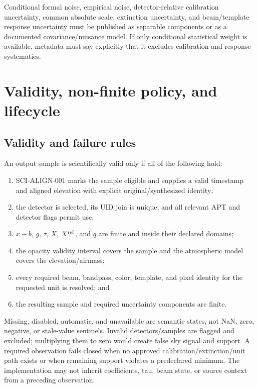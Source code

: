 \documentclass[11pt]{article}
\begin{document}
Conditional formal noise, empirical noise, detector-relative calibration
uncertainty, common absolute scale, extinction uncertainty, and beam/template
response uncertainty must be published as separable components or as a
documented covariance/nuisance model.  If only conditional statistical weight
is available, metadata must say explicitly that it excludes calibration and
response systematics.

\section{Validity, non-finite policy, and lifecycle}

\subsection{Validity and failure rules}

An output sample is scientifically valid only if all of the following hold:

\begin{enumerate}[leftmargin=*]
\item SCI-ALIGN-001 marks the sample eligible and supplies a valid timestamp
and aligned elevation with explicit original/synthesized identity;
\item the detector is selected, its UID join is unique, and all relevant APT
and detector flags permit use;
\item \(x-b\), \(g\), \(\tau\), \(X\), \(X^{\rm ref}\), and \(q\) are finite and
inside their declared domains;
\item the opacity validity interval covers the sample and the atmospheric
model covers the elevation/airmass;
\item every required beam, bandpass, color, template, and pixel identity for
the requested unit is resolved; and
\item the resulting sample and required uncertainty components are finite.
\end{enumerate}

Missing, disabled, automatic, and unavailable are semantic states, not NaN,
zero, negative, or stale-value sentinels.  Invalid detectors/samples are
flagged and excluded; multiplying them to zero would create false sky signal
and support.  A required observation fails closed when no approved
calibration/extinction/unit path exists or when remaining support violates a
predeclared minimum.  The implementation may not inherit coefficients, tau,
beam state, or source context from a preceding observation.
\end{document}
